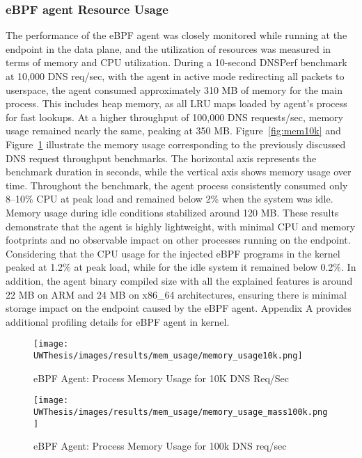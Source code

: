 \documentclass [11pt, proquest] {uwthesis}[2020/02/24]
\begin{document}
\subsubsection{eBPF agent Resource Usage}
The performance of the eBPF agent was closely monitored while running at the endpoint in the data plane, and the utilization of resources was measured in terms of memory and CPU utilization. During a 10-second DNSPerf benchmark at 10,000 DNS req/sec, with the agent in active mode redirecting all packets to userspace, the agent consumed approximately 310 MB of memory for the main process. This includes heap memory, as all LRU maps loaded by agent's process for fast lookups. At a higher throughput of 100,000 DNS requests/sec, memory usage remained nearly the same, peaking at 350 MB. Figure~\ref{fig:mem10k} and Figure~\ref{fig:mem100k} illustrate the memory usage corresponding to the previously discussed DNS request throughput benchmarks. The horizontal axis represents the benchmark duration in seconds, while the vertical axis shows memory usage over time.
Throughout the benchmark, the agent process consistently consumed only 8–10\% CPU at peak load and remained below 2\% when the system was idle. Memory usage during idle conditions stabilized around 120 MB. These results demonstrate that the agent is highly lightweight, with minimal CPU and memory footprints and no observable impact on other processes running on the endpoint. Considering that the CPU usage for the injected eBPF programs in the kernel peaked at 1.2\% at peak load, while for the idle system it remained below 0.2\%. In addition, the agent binary compiled size with all the explained features is around 22 MB on ARM and 24 MB on x86\_64 architectures, ensuring there is minimal storage impact on the endpoint caused by the eBPF agent. Appendix A provides additional profiling details for eBPF agent in kernel.

\begin{figure}[H]
  \centering
  \begin{minipage}[b]{0.48\textwidth}
    \centering
    \texttt{[image: UWThesis/images/results/mem\_usage/memory\_usage10k.png]}
    \caption{eBPF Agent: Process Memory Usage for 10K DNS Req/Sec}
    \label{fig:mem10k}
  \end{minipage}
  \hfill
  \begin{minipage}[b]{0.48\textwidth}
    \centering
    \texttt{[image: UWThesis/images/results/mem\_usage/memory\_usage\_mass100k.png]}
    \caption{eBPF Agent: Process Memory Usage for 100k DNS req/sec}
    \label{fig:mem100k}
  \end{minipage}
\end{figure}
\end{document}
